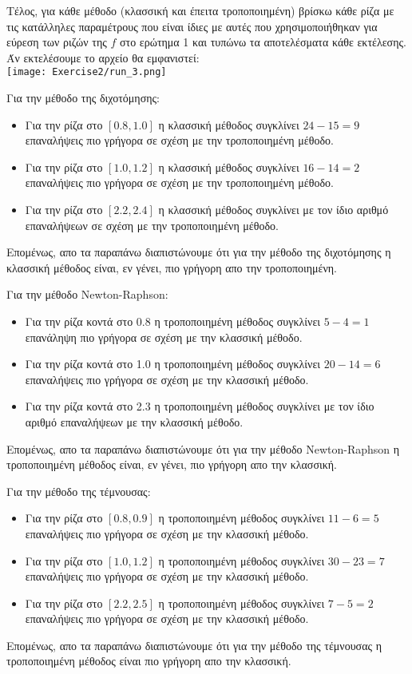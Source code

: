 \documentclass[a4paper,11pt]{article}
\newcommand{\lt}{\latintext}
\begin{document}
Τέλος, για κάθε μέθοδο (κλασσική και έπειτα τροποποιημένη) βρίσκω κάθε ρίζα με τις κατάλληλες παραμέτρους που είναι ίδιες με αυτές που χρησιμοποιήθηκαν για εύρεση των ριζών της $f$ στο ερώτημα 1 και τυπώνω τα αποτελέσματα κάθε εκτέλεσης.\\

Άν εκτελέσουμε το αρχείο θα εμφανιστεί:\\
\texttt{[image: Exercise2/run\_3.png]}\\


\par
Για την μέθοδο της διχοτόμησης:
\begin{itemize}
    \item Για την ρίζα στο $[0.8, 1.0]$ η κλασσική μέθοδος συγκλίνει $24 - 15 = 9$ επαναλήψεις πιο γρήγορα σε σχέση με την τροποποιημένη μέθοδο.
    \item Για την ρίζα στο $[1.0, 1.2]$ η κλασσική μέθοδος συγκλίνει $16 - 14 = 2$ επαναλήψεις πιο γρήγορα σε σχέση με την τροποποιημένη μέθοδο.
    \item Για την ρίζα στο $[2.2, 2.4]$ η κλασσική μέθοδος συγκλίνει με τον ίδιο αριθμό επαναλήψεων σε σχέση με την τροποποιημένη μέθοδο.
\end{itemize}
Επομένως, απο τα παραπάνω διαπιστώνουμε ότι για την μέθοδο της διχοτόμησης η κλασσική μέθοδος είναι, εν γένει, πιο γρήγορη απο την τροποποιημένη.\\

\par
Για την μέθοδο {\lt Newton-Raphson}:
\begin{itemize}
    \item Για την ρίζα κοντά στο 0.8 η τροποποιημένη μέθοδος συγκλίνει $5 - 4 = 1$ επανάληψη πιο γρήγορα σε σχέση με την κλασσική μέθοδο.
    \item Για την ρίζα κοντά στο 1.0 η τροποποιημένη μέθοδος συγκλίνει $20 - 14 = 6$ επαναλήψεις πιο γρήγορα σε σχέση με την κλασσική μέθοδο.
    \item Για την ρίζα κοντά στο 2.3 η τροποποιημένη μέθοδος συγκλίνει με τον ίδιο αριθμό επαναλήψεων με την κλασσική μέθοδο.
\end{itemize}
Επομένως, απο τα παραπάνω διαπιστώνουμε ότι για την μέθοδο {\lt Newton-Raphson} η τροποποιημένη μέθοδος είναι, εν γένει, πιο γρήγορη απο την κλασσική.\\


\par
Για την μέθοδο της τέμνουσας:
\begin{itemize}
    \item Για την ρίζα στο $[0.8, 0.9]$ η τροποποιημένη μέθοδος συγκλίνει $11 - 6 = 5$ επαναλήψεις πιο γρήγορα σε σχέση με την κλασσική μέθοδο.
    \item Για την ρίζα στο $[1.0, 1.2]$ η τροποποιημένη μέθοδος συγκλίνει $30 - 23 = 7$ επαναλήψεις πιο γρήγορα σε σχέση με την κλασσική μέθοδο.
    \item Για την ρίζα στο $[2.2, 2.5]$ η τροποποιημένη μέθοδος συγκλίνει $7 - 5 = 2$ επαναλήψεις πιο γρήγορα σε σχέση με την κλασσική μέθοδο.
\end{itemize}
Επομένως, απο τα παραπάνω διαπιστώνουμε ότι για την μέθοδο της τέμνουσας η τροποποιημένη μέθοδος είναι πιο γρήγορη απο την κλασσική.
\end{document}
